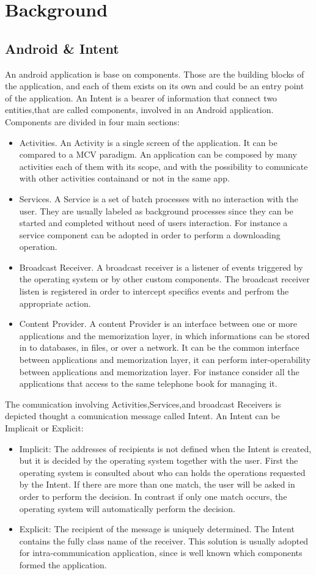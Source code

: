\chapter{Background}
\section{Android \& Intent}
An android application is base on components. Those are the building blocks of the application, and each of them exists on its own and could be an entry point of the application. 
An Intent is a bearer of information that connect two entities,that are called components, involved in an Android application.
Components are divided in four main sections:
\begin{itemize}
	\item Activities. An Activity is a single screen of the application. It can be compared to a MCV paradigm. An application can be composed by many activities each of them with its scope, and with the possibility to comunicate with other activities containand or not in the same app.
	\item Services. A Service is a set of batch processes with no interaction with the user. They are usually labeled as background processes since they can be started and completed without need of users interaction. For instance a service component can be adopted in order to perform a downloading operation.
	\item Broadcast Receiver. A broadcast receiver is a listener of events triggered by the operating system or by other custom components. The broadcast receiver listen is registered in order to intercept specifics events and perfrom the appropriate action.
	\item Content Provider. A content Provider is an interface between one or more applications and the memorization layer, in which informations can be stored in to databases, in files, or over a network. It can be the common interface between applications and memorization layer, it can perform inter-operability between applications and memorization layer. For instance consider all the applications that access to the same telephone book for managing it.
\end{itemize}
The comunication involving Activities,Services,and broadcast Receivers is depicted thought a comunication message called Intent. 
An Intent can be Implicait or Explicit:
\begin{itemize}
	\item Implicit: The addresses of recipients is not defined when the Intent is created, but it is decided by the operating system together with the user. First the operating system is consulted about who can holds the operations requested by the Intent. If there are more than one match, the user will be asked in order to perform the decision. In contrast if only one match occurs, the operating system will automatically perform the decision.
	\item Explicit: The recipient of the message is uniquely determined. The Intent contains the fully class name of the receiver. This solution is usually adopted for intra-communication application, since is well known which components formed the application.
\end{itemize}

